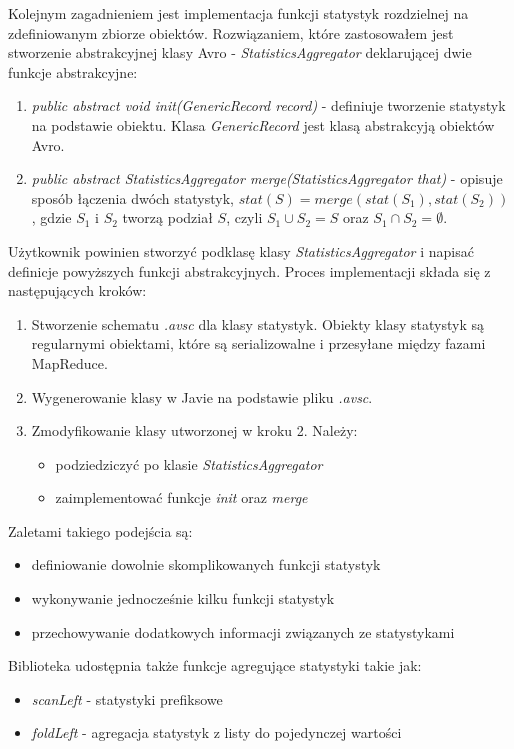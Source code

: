 \documentclass[licencjacka]{pracamgr}
\begin{document}
Kolejnym zagadnieniem jest implementacja funkcji statystyk rozdzielnej na zdefiniowanym zbiorze obiektów. Rozwiązaniem, które zastosowałem jest stworzenie abstrakcyjnej klasy Avro -  \textit{StatisticsAggregator} deklarującej dwie funkcje abstrakcyjne:
\begin{enumerate}
    \item \textit{public abstract void init(GenericRecord record)} - definiuje tworzenie statystyk na podstawie obiektu. Klasa \textit{GenericRecord} jest klasą abstrakcyją obiektów Avro.
    \item \textit{public abstract StatisticsAggregator merge(StatisticsAggregator that)} - opisuje sposób łączenia dwóch statystyk, \(stat(S) = merge(stat(S_1), stat(S_2))\), gdzie \(S_1\) i \(S_2\) tworzą podział \(S\), czyli \(S_1 \cup S_2 = S\) oraz \(S_1 \cap S_2 = \emptyset\).
\end{enumerate}

Użytkownik powinien stworzyć podklasę klasy \textit{StatisticsAggregator} i napisać definicje powyższych funkcji abstrakcyjnych. Proces implementacji składa się z następujących kroków:
\begin{enumerate}
    \item Stworzenie schematu \textit{.avsc} dla klasy statystyk. Obiekty klasy statystyk są regularnymi obiektami, które są serializowalne i przesyłane między fazami MapReduce.
    \item Wygenerowanie klasy w Javie na podstawie pliku \textit{.avsc}.
    \item Zmodyfikowanie klasy utworzonej w kroku 2. Należy:
        \begin{itemize}
            \item podziedziczyć po klasie \textit{StatisticsAggregator}
            \item zaimplementować funkcje \textit{init} oraz \textit{merge}
        \end{itemize}
\end{enumerate}

Zaletami takiego podejścia są:
\begin{itemize}
    \item definiowanie dowolnie skomplikowanych funkcji statystyk
    \item wykonywanie jednocześnie kilku funkcji statystyk
    \item przechowywanie dodatkowych informacji związanych ze statystykami
\end{itemize}

Biblioteka udostępnia także funkcje agregujące statystyki takie jak:
\begin{itemize}
    \item \textit{scanLeft} - statystyki prefiksowe
    \item \textit{foldLeft} - agregacja statystyk z listy do pojedynczej wartości
\end{itemize}
\end{document}

